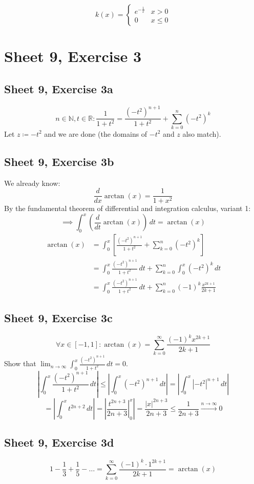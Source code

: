 \documentclass{article}
\newcommand{\card}[1]{\left|#1\right|}
\begin{document}
\[ k(x) = \begin{cases} e^{-\frac1x} & x > 0 \\ 0 & x \leq 0 \end{cases} \]

\section{Sheet 9, Exercise 3}
\subsection{Sheet 9, Exercise 3a}
\[ n \in \mathbb N, t \in \mathbb R: \frac{1}{1 + t^2} = \frac{(-t^2)^{n+1}}{1 + t^2} + \sum_{k=0}^n (-t^2)^k \]
Let $z \coloneqq -t^2$ and we are done (the domains of $-t^2$ and $z$ also match).

\subsection{Sheet 9, Exercise 3b}
We already know:
\[ \frac{d}{dx} \arctan(x) = \frac{1}{1 + x^2} \]
By the fundamental theorem of differential and integration calculus, variant 1:
\[ \implies \int_0^x \left(\frac{d}{dt} \arctan(x)\right) \, dt = \arctan(x) \]
\begin{align*}
  \arctan(x) &= \int_0^x \left[\frac{(-t^2)^{n+1}}{1 + t^2} + \sum_{k=0}^n (-t^2)^k\right] \\
    &= \int_0^x \frac{(-t^2)^{n+1}}{1 + t^2} \, dt + \sum_{k=0}^n \int_0^x (-t^2)^k \, dt \\
    &= \int_0^x \frac{(-t^2)^{n+1}}{1 + t^2} \, dt + \sum_{k=0}^n (-1)^k \frac{x^{2k+1}}{2k + 1}
\end{align*}

\subsection{Sheet 9, Exercise 3c}
\[ \forall x \in [-1, 1]: \arctan(x) = \sum_{k=0}^\infty \frac{(-1)^k x^{2k+1}}{2k + 1} \]
Show that $\lim_{n\to\infty} \int_0^x \frac{(-t^2)^{n+1}}{1 + t^2} \, dt = 0$.
\[ \card{\int_0^x \frac{(-t^2)^{n+1}}{1 + t^2} \, dt} \leq \card{\int_0^x (-t^2)^{n+1} \, dt} = \card{\int_0^x \card{-t^2}^{n+1} \, dt} \]
\[ = \card{\int_0^x t^{2n+2} \, dt} = \card{\left.\frac{t^{2n+3}}{2n+3} \right|_0^x} = \frac{\card{x}^{2n + 3}}{2n + 3} \leq \frac{1}{2n+3} \xrightarrow{n \to \infty} 0 \]

\subsection{Sheet 9, Exercise 3d}
\[ 1 - \frac13 + \frac15 - \dots = \sum_{k=0}^\infty \frac{(-1)^k \cdot 1^{2k+1}}{2k + 1} = \arctan(x) \]
\end{document}
